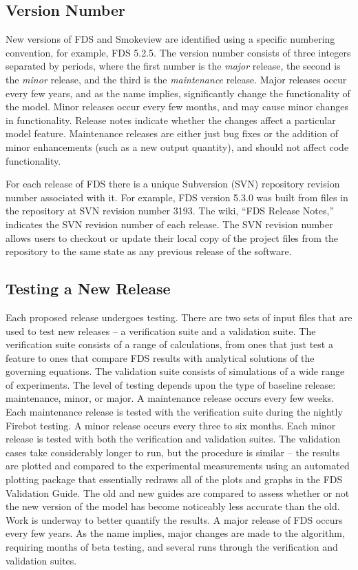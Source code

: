 \documentclass[11pt]{book}
\begin{document}
\subsection{Version Number}

New versions of FDS and Smokeview are identified using a specific numbering convention, for example, FDS 5.2.5. The version number consists of three integers separated by periods, where the first number is the {\em major} release, the second is the {\em minor} release, and the third is the {\em maintenance} release.  Major releases occur every few years, and as the name implies, significantly change the functionality of the model. Minor releases occur every few months, and may cause minor changes in functionality. Release notes indicate whether the changes affect a particular model feature. Maintenance releases are either just bug fixes or the addition of minor enhancements (such as a new output quantity), and should not affect code functionality.

For each release of FDS there is a unique Subversion (SVN) repository revision number associated with it. For example, FDS version 5.3.0 was built from files in the repository at SVN revision number 3193. The wiki, ``FDS Release Notes,'' indicates the SVN revision number of each release. The SVN revision number allows users to checkout or update their local copy of the project files from the repository to the same state as any previous release of the software.

\subsection{Testing a New Release}

Each proposed release undergoes testing. There are two sets of input files that are used to test new releases -- a verification suite and a validation suite. The verification suite consists of a range of calculations, from ones that just test a feature to ones that compare FDS results with analytical solutions of the governing equations. The validation suite consists of simulations of a wide range of experiments. The level of testing depends upon the type of baseline release: maintenance, minor, or major. A maintenance release occurs every few weeks. Each maintenance release is tested with the verification suite during the nightly Firebot testing. A minor release occurs every three to six months. Each minor release is tested with both the verification and validation suites. The validation cases take considerably longer to run, but the procedure is similar -- the results are plotted and compared to the experimental measurements using an automated plotting package that essentially redraws all of the plots and graphs in the FDS Validation Guide. The old and new guides are compared to assess whether or not the new version of the model has become noticeably less accurate than the old. Work is underway to better quantify the results. A major release of FDS occurs every few years. As the name implies, major changes are made to the algorithm, requiring months of beta testing, and several runs through the verification and validation suites.
\end{document}
